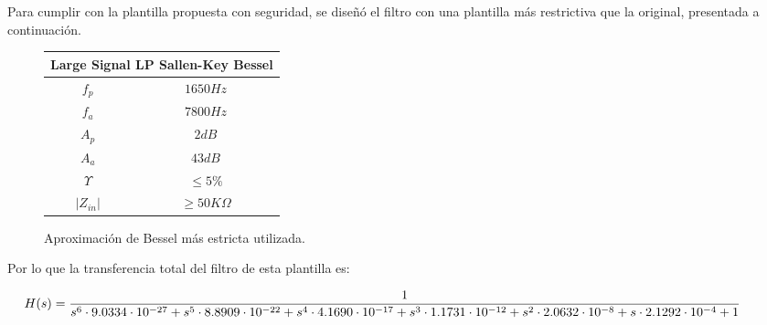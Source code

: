 Para cumplir con la plantilla propuesta con seguridad, se diseñó el filtro con una plantilla más restrictiva que la original, presentada a continuación.
\begin{figure}[H]
		\begin{table}[H]
			\centering
			\begin{tabular}{@{}cc@{}}
			\toprule
			\multicolumn{2}{c}{Large Signal LP Sallen-Key Bessel} \\ \midrule
			$f_p$ & $1650Hz$ \\
			$f_a$ & $7800Hz$ \\
			$A_p$ & $2dB$ \\
			$A_a$ & $43dB$ \\
			$\Upsilon$ & $\leq 5\%$ \\
			$\left| Z_{in}\right|$ & $\geq 50K\Omega$ \\ \bottomrule
			\end{tabular}
		\end{table}
		\caption{Aproximación de Bessel más estricta utilizada.}
		\label{aprox_leg_est}
\end{figure}

Por lo que la transferencia total del filtro de esta plantilla es:

\begin{equation}
\hspace{-1cm}
H(s) = \frac{1}{s^6 \cdot 9.0334\cdot10^{-27}+s^5\cdot 8.8909\cdot10^{-22}+s^4\cdot 4.1690\cdot10^{-17}+s^3\cdot 1.1731\cdot10^{-12}+s^2\cdot 2.0632\cdot10^{-8}+s\cdot 2.1292\cdot10^{-4}+1}
\label{hsbesteo}
\end{equation}

